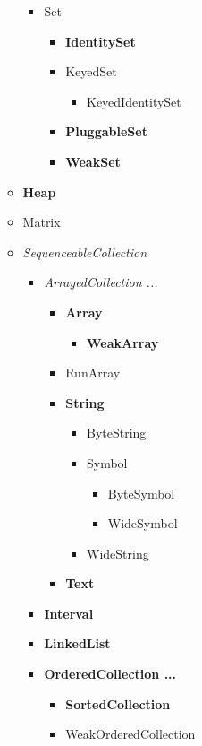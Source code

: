 \documentclass[a4paper,10pt,twoside]{book}
\begin{document}
\begin{figure}
\begin{center}
\begin{itemize}
\begin{itemize}
\begin{itemize}
        \item{Set}
            \begin{itemize}
            \item{\textbf{IdentitySet}}
            \item{KeyedSet}
                \begin{itemize}
                \item{KeyedIdentitySet}
                \end{itemize}
            \item{\textbf{PluggableSet}}
            \item{\textbf{WeakSet}}
            \end{itemize}
        \end{itemize}
    \item{\textbf{Heap}}
    \item{Matrix}
    \item{\emph{SequenceableCollection}}
        \begin{itemize}
        \item{\emph{ArrayedCollection ...}}
            \begin{itemize}
            \item{\textbf{Array}}
                \begin{itemize}
                \item{\textbf{WeakArray}}
                \end{itemize}
            \item{RunArray}
            \item{\textbf{String}}
                \begin{itemize}
                \item{ByteString}
                \item{Symbol}
                    \begin{itemize}
                    \item{ByteSymbol}
                    \item{WideSymbol}
                    \end{itemize}
                \item{WideString}
                \end{itemize}
            \item{\textbf{Text}}
            \end{itemize}
        \item{\textbf{Interval}}
        \item{\textbf{LinkedList}}
        \item{\textbf{OrderedCollection ...}}
            \begin{itemize}
            \item{\textbf{SortedCollection}}
            \item{WeakOrderedCollection}
            \end{itemize}
        \end{itemize}
    \end{itemize}
\end{itemize}


\end{center}
\end{figure}
\end{document}

